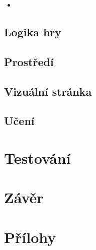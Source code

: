 \begin{itemize}
  \item \emph {}
\end{itemize}

\section{Logika hry}
\section{Prostředí}
\section{Vizuální stránka}
\section{Učení}



\chapter{Testování}
\label{testovani}
\chapter{Závěr}
\label{zaver}
\chapter{Přílohy}
\label{prilohy}




%
